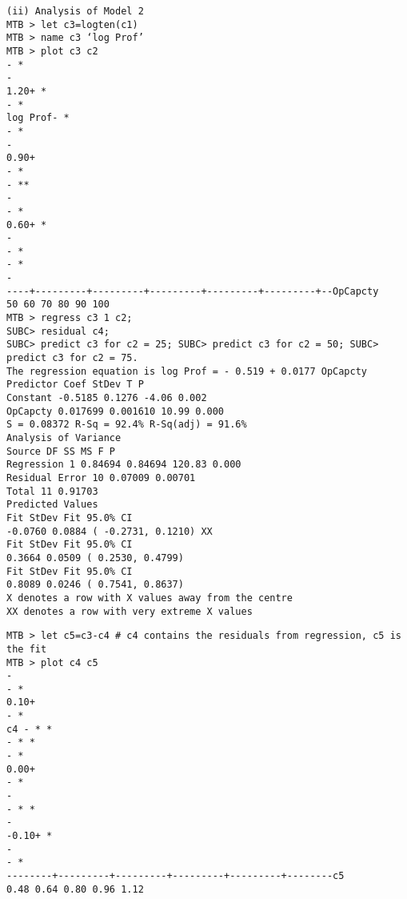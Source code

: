\documentclass[a4paper,12pt]{article}
\begin{document}
\begin{framed}
\begin{verbatim}
(ii) Analysis of Model 2
MTB > let c3=logten(c1)
MTB > name c3 ‘log Prof’
MTB > plot c3 c2
- *
-
1.20+ *
- *
log Prof- *
- *
-
0.90+
- *
- **
-
- *
0.60+ *
-
- *
- *
-
----+---------+---------+---------+---------+---------+--OpCapcty
50 60 70 80 90 100
MTB > regress c3 1 c2;
SUBC> residual c4;
SUBC> predict c3 for c2 = 25; SUBC> predict c3 for c2 = 50; SUBC> predict c3 for c2 = 75.
The regression equation is log Prof = - 0.519 + 0.0177 OpCapcty
Predictor Coef StDev T P
Constant -0.5185 0.1276 -4.06 0.002
OpCapcty 0.017699 0.001610 10.99 0.000
S = 0.08372 R-Sq = 92.4% R-Sq(adj) = 91.6%
Analysis of Variance
Source DF SS MS F P
Regression 1 0.84694 0.84694 120.83 0.000
Residual Error 10 0.07009 0.00701
Total 11 0.91703
Predicted Values
Fit StDev Fit 95.0% CI
-0.0760 0.0884 ( -0.2731, 0.1210) XX
Fit StDev Fit 95.0% CI
0.3664 0.0509 ( 0.2530, 0.4799)
Fit StDev Fit 95.0% CI
0.8089 0.0246 ( 0.7541, 0.8637)
X denotes a row with X values away from the centre
XX denotes a row with very extreme X values
\end{verbatim}
\end{framed}
\newpage
\begin{framed}
\begin{verbatim}
MTB > let c5=c3-c4 # c4 contains the residuals from regression, c5 is the fit
MTB > plot c4 c5
-
- *
0.10+
- *
c4 - * *
- * *
- *
0.00+
- *
-
- * *
-
-0.10+ *
-
- *
--------+---------+---------+---------+---------+--------c5
0.48 0.64 0.80 0.96 1.12



\end{verbatim}
\end{framed}
\end{document}
